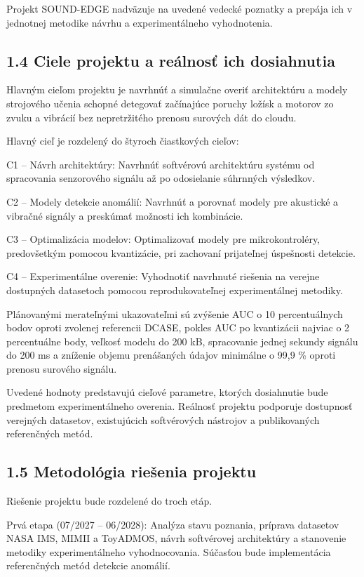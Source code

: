 \documentclass[10pt,a4paper]{article}
\begin{document}
Projekt SOUND-EDGE nadväzuje na uvedené vedecké poznatky a prepája ich v jednotnej metodike návrhu a experimentálneho vyhodnotenia.

\subsection*{1.4 Ciele projektu a reálnosť
ich dosiahnutia}

Hlavným cieľom projektu je navrhnúť a simulačne overiť architektúru a modely strojového učenia schopné detegovať začínajúce poruchy ložísk a motorov zo zvuku a vibrácií bez nepretržitého prenosu surových dát do cloudu.

Hlavný cieľ je rozdelený do štyroch čiastkových cieľov:

C1 – Návrh architektúry: Navrhnúť softvérovú architektúru systému od spracovania senzorového signálu až po odosielanie súhrnných výsledkov.

C2 – Modely detekcie anomálií: Navrhnúť a porovnať modely pre akustické a vibračné signály a preskúmať možnosti ich kombinácie.

C3 – Optimalizácia modelov: Optimalizovať modely pre mikrokontroléry, predovšetkým pomocou kvantizácie, pri zachovaní prijateľnej úspešnosti detekcie.

C4 – Experimentálne overenie: Vyhodnotiť navrhnuté riešenia na verejne dostupných datasetoch pomocou reprodukovateľnej experimentálnej metodiky.

Plánovanými merateľnými ukazovateľmi sú zvýšenie AUC o 10 percentuálnych bodov oproti zvolenej referencii DCASE, pokles AUC po kvantizácii najviac o 2 percentuálne body, veľkosť modelu do 200 kB, spracovanie jednej sekundy signálu do 200 ms a zníženie objemu prenášaných údajov minimálne o 99,9 \% oproti prenosu surového signálu.

Uvedené hodnoty predstavujú cieľové parametre, ktorých dosiahnutie bude predmetom experimentálneho overenia. Reálnosť projektu podporuje dostupnosť verejných datasetov, existujúcich softvérových nástrojov a publikovaných referenčných metód.

\subsection*{1.5 Metodológia riešenia projektu}

Riešenie projektu bude rozdelené do troch etáp.

Prvá etapa (07/2027 – 06/2028): Analýza stavu poznania, príprava datasetov NASA IMS, MIMII a ToyADMOS, návrh softvérovej architektúry a stanovenie metodiky experimentálneho vyhodnocovania. Súčasťou bude implementácia referenčných metód detekcie anomálií.
\end{document}
